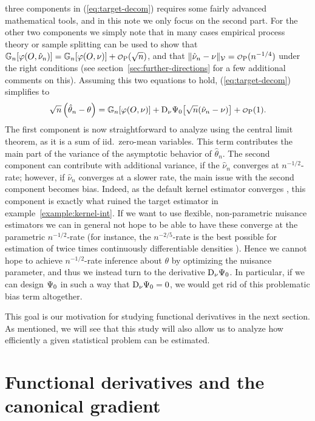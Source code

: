 \documentclass[a4,danish]{article}
\begin{document}
three components in (\ref{eq:target-decom}) requires some fairly advanced mathematical tools, and in
this note we only focus on the second part. For the other two components we simply note that in many
cases empirical process theory or sample splitting can be used to show that
$\G{\phi(O, \hat{\nu}_n)} = \G{\phi(O, \nu)} + \smallO_{\P}(\sqrt{n})$, and that
$\Vert \hat{\nu}_n - \nu \Vert_{\mathcal{V}} = \smallO_{\P}(n^{-1/4})$  under the right conditions
(see section~\ref{sec:further-directions} for a few additional comments on this). Assuming this two
equations to hold, (\ref{eq:target-decom}) simplifies to
\begin{equation*}
  \sqrt{n}
  \left(
    \hat{\theta}_n - \theta
  \right)
  = \G{\phi( O, \nu)}
  + \mathrm{D_{\nu}{\TT_0}}{ \left[
      \sqrt{n}(\hat{\nu}_n - \nu)
    \right]}
  + 
  \smallO_{\P}(1).  
\end{equation*}
The first component is now straightforward to analyze using the central limit theorem, as it is a
sum of iid.\ zero-mean variables. This term contributes the main part of the variance of the
asymptotic behavior of $\hat{\theta}_n$. The second component can contribute with additional
variance, if the $\hat{\nu}_n$ converges at $n^{-1/2}$-rate; however, if $\hat{\nu}_n$ converges at
a slower rate, the main issue with the second component becomes bias. Indeed, as the default kernel
estimator converges , this component is exactly what ruined the
target estimator in example~\ref{example:kernel-int}. If we want to use flexible, non-parametric
nuisance estimators we can in general not hope to be able to have these converge at the parametric
$n^{-1/2}$-rate (for instance, the $n^{-2/5}$-rate is the best possible for estimation of twice
times continuously differentiable densities \citep[chp.~24]{van2000asymptotic}). Hence we cannot
hope to achieve $n^{-1/2}$-rate inference about $\theta$ by optimizing the nuisance parameter, and
thus we instead turn to the derivative $\mathrm{D_{\nu}{\operatorname{\Psi}_0}}$. In particular, if we can design
$\operatorname{\Psi}_0$ in such a way that $\mathrm{D_{\nu}{\operatorname{\Psi}_0}} = 0$, we would get rid of this problematic bias
term altogether.

This goal is our motivation for studying functional derivatives in the next section. As mentioned,
we will see that this study will also allow us to analyze how efficiently a given statistical
problem can be estimated.

\section{Functional derivatives and the canonical gradient}
\label{sec:funct-deriv-can-grad}
\end{document}
